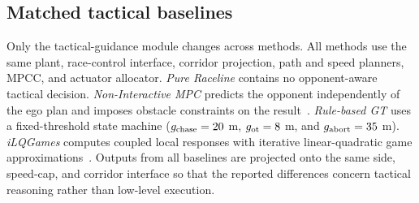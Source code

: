 
\subsection{Matched tactical baselines}
\label{subsec:comparison}

Only the tactical-guidance module changes across methods. All methods use the
same plant, race-control interface, corridor projection, path and speed
planners, MPCC, and actuator allocator. \emph{Pure Raceline} contains no
opponent-aware tactical decision. \emph{Non-Interactive MPC} predicts the
opponent independently of the ego plan and imposes obstacle constraints on the
result~\cite{kabzan2020amzracing,betz2023autonomous}.
\emph{Rule-based GT} uses a fixed-threshold state machine
($g_{\rm chase}=20$ m, $g_{\rm ot}=8$ m, and $g_{\rm abort}=35$ m).
\emph{iLQGames} computes coupled local responses with iterative
linear-quadratic game approximations~\cite{fridovich2020ilqgames}. Outputs from
all baselines are projected onto the same side, speed-cap, and corridor
interface so that the reported differences concern tactical reasoning rather
than low-level execution.

